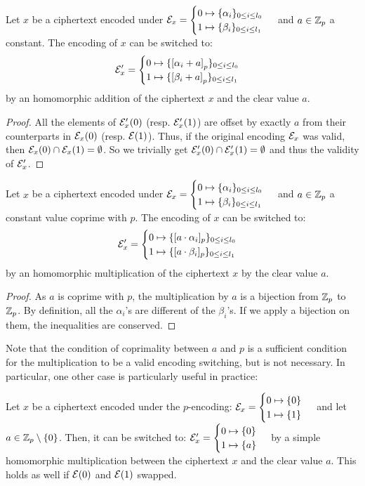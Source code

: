 \begin{property}
    \label{prop:sum_constant}
    Let $x$ be a ciphertext encoded under $\mathcal{E}_x = \begin{cases} 0 \mapsto \{\alpha_i\}_{0 \le i \le l_0} \\ 1 \mapsto \{\beta_i\}_{0 \le i \le l_1} \end{cases} $ and $a \in \mathbb{Z}_p$ a constant. The encoding of $x$ can be switched to:
    \[\mathcal{E}_x' = \begin{cases} 0 \mapsto \{\left [ \alpha_i + a \right ]_{p}\}_{0 \le i \le l_0} \\ 1 \mapsto \{\left [ \beta_i + a \right ]_{p}\}_{0 \le i \le l_1} \end{cases}\] by an homomorphic addition of the ciphertext $x$ and the clear value $a$. 
\end{property}

\begin{proof}
    All the elements of $\mathcal{E}_x'(0)$ (resp. $\mathcal{E}_x'(1)$) are offset by exactly $a$ from their counterparts in $\mathcal{E}_x(0)$ (resp. $\mathcal{E}(1)$). Thus, if the original encoding $\mathcal{E}_x$ was valid, then $\mathcal{E}_x(0) \cap \mathcal{E}_x(1) = \emptyset$. So we trivially get  $\mathcal{E}_x'(0) \cap \mathcal{E}_x'(1) = \emptyset$ and thus the validity of $\mathcal{E}_x'$.
\end{proof}


\begin{property}
    \label{prop:mult_constant}
    Let $x$ be a ciphertext encoded under $\mathcal{E}_x = \begin{cases} 0 \mapsto \{\alpha_i\}_{0 \le i \le l_0} \\ 1 \mapsto \{\beta_i\}_{0 \le i \le l_1} \end{cases} $ and $a \in \mathbb{Z}_p$ a constant value coprime with $p$. The encoding of $x$ can be switched to:
    \[\mathcal{E}'_x = \begin{cases} 0 \mapsto \{[a \cdot \alpha_i]_p\}_{0 \le i \le l_0} \\ 1 \mapsto \{[a \cdot \beta_i]_p\}_{0 \le i \le l_1} \end{cases}\]
    by an homomorphic multiplication of the ciphertext $x$ by the clear value $a$.
\end{property}
\begin{proof}
As $a$ is coprime with $p$, the multiplication by $a$ is a bijection from $\mathbb{Z}_p$ to $\mathbb{Z}_p$. By definition, all the $\alpha_i$'s are different of the $\beta_i$'s. If we apply a bijection on them, the inequalities are conserved.
\end{proof}

Note that the condition of coprimality between $a$ and $p$ is a sufficient condition for the multiplication to be a valid encoding switching, but is not necessary. In particular, one other case is particularly useful in practice:

\begin{property}
\label{prop:mult_from_1}
    Let $x$ be a ciphertext encoded under the $p$-encoding: $\mathcal{E}_x = \begin{cases} 0 \mapsto \{0\} \\ 1 \mapsto \{1\} \end{cases}$ and let $a \in \mathbb{Z}_p \setminus \{0\}$. Then, it can be switched to: $\mathcal{E}'_x = \begin{cases} 0 \mapsto \{0\} \\ 1 \mapsto \{a\} \end{cases}$ by a simple homomorphic multiplication between the ciphertext $x$ and the clear value $a$.
    This holds as well if $\mathcal{E}(0)$ and $\mathcal{E}(1)$ swapped.
\end{property}

